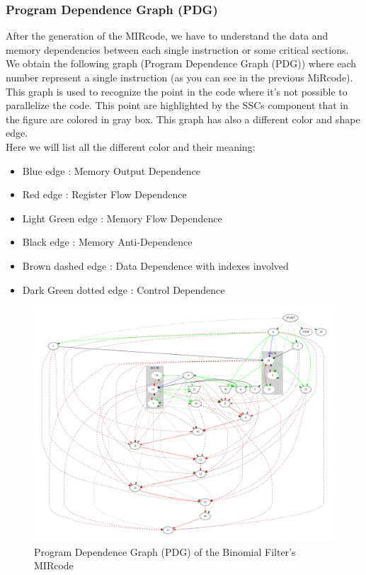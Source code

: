 \subsubsection{Program Dependence Graph (PDG)}
After the generation of the MIRcode, we have to understand the data and memory dependencies between each single instruction or some critical sections.
We obtain the following graph (Program Dependence Graph (PDG)) where each number represent a single instruction (as you can see in the previous MiRcode).\\

 This graph is used to recognize the point in the code where it's not possible to parallelize the code. This point are highlighted by the SSCs component that in the figure are colored in gray box. This graph has also a different color and shape edge.\\
  Here we will list all the different color and their meaning: 
  \begin{itemize}
   \item Blue edge : Memory Output Dependence
   \item Red edge : Register Flow Dependence 
   \item Light Green edge : Memory Flow Dependence  
   \item Black edge : Memory Anti-Dependence
   \item Brown dashed edge : Data Dependence with indexes involved 
   \item Dark Green dotted edge : Control Dependence 
  \end{itemize}
  \begin{figure}[h!]
  	\centering
  	\includegraphics[width=\textwidth]{imm/tessa/PDGscc.pdf} 	\caption{Program Dependence Graph (PDG) of the Binomial Filter's MIRcode
  	} 
  	\label{pdg}
  \end{figure}
  \clearpage
